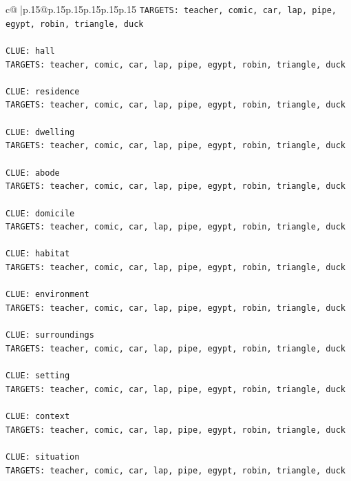 \documentclass{article}
\begin{document}
{\begin{supertabular}{c@{$\;$}|p{.15\linewidth}@{}p{.15\linewidth}p{.15\linewidth}p{.15\linewidth}p{.15\linewidth}p{.15\linewidth}}
{{{\texttt{TARGETS: teacher, comic, car, lap, pipe, egypt, robin, triangle, duck} \\
\\ 
\texttt{CLUE: hall} \\
\texttt{TARGETS: teacher, comic, car, lap, pipe, egypt, robin, triangle, duck} \\
\\ 
\texttt{CLUE: residence} \\
\texttt{TARGETS: teacher, comic, car, lap, pipe, egypt, robin, triangle, duck} \\
\\ 
\texttt{CLUE: dwelling} \\
\texttt{TARGETS: teacher, comic, car, lap, pipe, egypt, robin, triangle, duck} \\
\\ 
\texttt{CLUE: abode} \\
\texttt{TARGETS: teacher, comic, car, lap, pipe, egypt, robin, triangle, duck} \\
\\ 
\texttt{CLUE: domicile} \\
\texttt{TARGETS: teacher, comic, car, lap, pipe, egypt, robin, triangle, duck} \\
\\ 
\texttt{CLUE: habitat} \\
\texttt{TARGETS: teacher, comic, car, lap, pipe, egypt, robin, triangle, duck} \\
\\ 
\texttt{CLUE: environment} \\
\texttt{TARGETS: teacher, comic, car, lap, pipe, egypt, robin, triangle, duck} \\
\\ 
\texttt{CLUE: surroundings} \\
\texttt{TARGETS: teacher, comic, car, lap, pipe, egypt, robin, triangle, duck} \\
\\ 
\texttt{CLUE: setting} \\
\texttt{TARGETS: teacher, comic, car, lap, pipe, egypt, robin, triangle, duck} \\
\\ 
\texttt{CLUE: context} \\
\texttt{TARGETS: teacher, comic, car, lap, pipe, egypt, robin, triangle, duck} \\
\\ 
\texttt{CLUE: situation} \\
\texttt{TARGETS: teacher, comic, car, lap, pipe, egypt, robin, triangle, duck} \\
}}}
\end{supertabular}}
\end{document}
